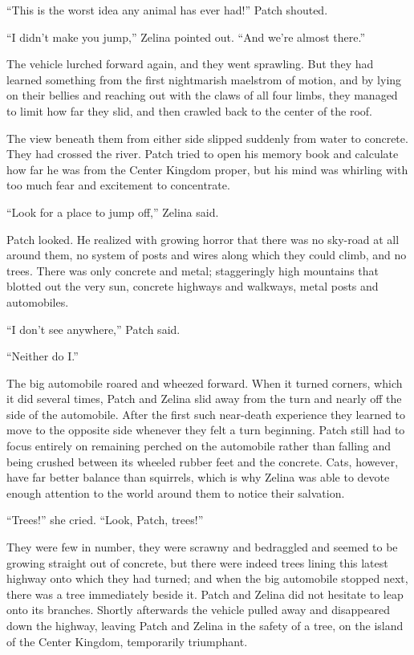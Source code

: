 \documentclass[12pt]{memoir}
\begin{document}
“This is the worst idea any animal has ever had!” Patch shouted.

“I didn’t make you jump,” Zelina pointed out. “And we’re almost
there.”

The vehicle lurched forward again, and they went sprawling. But they
had learned something from the first nightmarish maelstrom of motion,
and by lying on their bellies and reaching out with the claws of all
four limbs, they managed to limit how far they slid, and then crawled
back to the center of the roof.

The view beneath them from either side slipped suddenly from water to
concrete. They had crossed the river. Patch tried to open his memory
book and calculate how far he was from the Center Kingdom proper, but
his mind was whirling with too much fear and excitement to
concentrate.

“Look for a place to jump off,” Zelina said.

Patch looked. He realized with growing horror that there was no
sky-road at all around them, no system of posts and wires along which
they could climb, and no trees. There was only concrete and metal;
staggeringly high mountains that blotted out the very sun, concrete
highways and walkways, metal posts and automobiles.

“I don’t see anywhere,” Patch said.

“Neither do I.”

The big automobile roared and wheezed forward. When it turned corners,
which it did several times, Patch and Zelina slid away from the turn
and nearly off the side of the automobile. After the first such
near-death experience they learned to move to the opposite side
whenever they felt a turn beginning. Patch still had to focus entirely
on remaining perched on the automobile rather than falling and being
crushed between its wheeled rubber feet and the concrete. Cats,
however, have far better balance than squirrels, which is why Zelina
was able to devote enough attention to the world around them to notice
their salvation.

“Trees!” she cried. “Look, Patch, trees!”

They were few in number, they were scrawny and bedraggled and seemed
to be growing straight out of concrete, but there were indeed trees
lining this latest highway onto which they had turned; and when the
big automobile stopped next, there was a tree immediately beside
it. Patch and Zelina did not hesitate to leap onto its
branches. Shortly afterwards the vehicle pulled away and disappeared
down the highway, leaving Patch and Zelina in the safety of a tree, on
the island of the Center Kingdom, temporarily triumphant.
\end{document}
